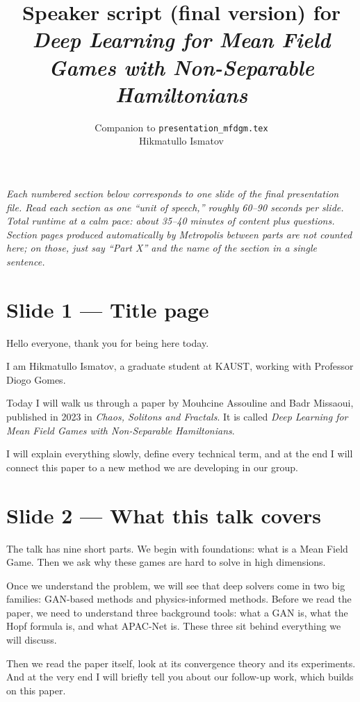 \documentclass[11pt]{article}
\title{Speaker script (final version) for\\
       \emph{Deep Learning for Mean Field Games with Non-Separable Hamiltonians}}
\author{Companion to \texttt{presentation\_mfdgm.tex}\\
        Hikmatullo Ismatov}
\date{}
\begin{document}
\maketitle

\textit{Each numbered section below corresponds to one slide of the final
presentation file.  Read each section as one ``unit of speech,'' roughly
60--90 seconds per slide.  Total runtime at a calm pace: about 35--40 minutes
of content plus questions.  Section pages produced automatically by Metropolis
between parts are not counted here; on those, just say ``Part X'' and the
name of the section in a single sentence.}

\section*{Slide 1 --- Title page}

Hello everyone, thank you for being here today.

I am Hikmatullo Ismatov, a graduate student at KAUST, working with
Professor Diogo Gomes.

Today I will walk us through a paper by Mouhcine Assouline and Badr
Missaoui, published in 2023 in \emph{Chaos, Solitons and Fractals}.  It is
called \emph{Deep Learning for Mean Field Games with Non-Separable
Hamiltonians}.

I will explain everything slowly, define every technical term, and at the
end I will connect this paper to a new method we are developing in our
group.

\section*{Slide 2 --- What this talk covers}

The talk has nine short parts.  We begin with foundations: what is a Mean
Field Game.  Then we ask why these games are hard to solve in high
dimensions.

Once we understand the problem, we will see that deep solvers come in two
big families: GAN-based methods and physics-informed methods.  Before we
read the paper, we need to understand three background tools: what a GAN
is, what the Hopf formula is, and what APAC-Net is.  These three sit
behind everything we will discuss.

Then we read the paper itself, look at its convergence theory and its
experiments.  And at the very end I will briefly tell you about our
follow-up work, which builds on this paper.
\end{document}
